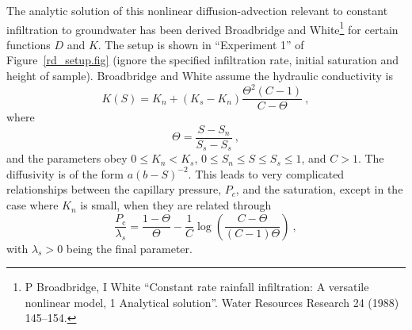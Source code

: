 \documentclass[]{scrreprt}
\begin{document}
The analytic solution of this nonlinear diffusion-advection relevant
to constant infiltration to groundwater has been derived Broadbridge
and White\footnote{P Broadbridge, I White ``Constant rate rainfall
  infiltration: A versatile nonlinear model, 1 Analytical solution''.
  Water Resources Research 24 (1988) 145--154.} for certain functions
$D$ and $K$.  The setup is shown in ``Experiment 1'' of
Figure~\ref{rd_setup.fig} (ignore the specified infiltration rate,
initial saturation and height of sample).  Broadbridge and White
assume the hydraulic conductivity is
\begin{equation}
K(S) = K_{n} + (K_{s}-K_{n})\frac{\Theta^{2}(C-1)}{C-\Theta} \ ,
\end{equation}
where 
\begin{equation}
\Theta = \frac{S - S_{n}}{S_{s} - S_{s}} \ ,
\end{equation}
and the parameters obey $0 \leq K_{n} < K_{s}$, $0 \leq S_{n} \leq S
\leq S_{s}\leq 1$, and $C>1$.  The diffusivity is of the form
$a(b-S)^{-2}$.  This leads to very complicated relationships between
the capillary pressure, $P_{c}$, and the saturation, except in the
case where $K_{n}$ is small, when they are related through
\begin{equation}
\frac{P_{\mathrm{c}}}{\lambda_{s}} = \frac{1-\Theta}{\Theta} - \frac{1}{C}\log
\left( \frac{C-\Theta}{(C-1)\Theta} \right) \ ,
\end{equation}
with $\lambda_{s}>0$ being the final parameter.
\end{document}
